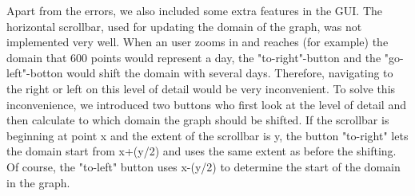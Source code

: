Apart from the errors, we also included some extra features in the GUI. The horizontal scrollbar, used for updating the domain of the graph, was not implemented very well. When an user zooms in and reaches (for example) the domain that 600 points would represent a day, the "to-right"-button and the "go-left"-botton would shift the domain with several days. Therefore, navigating to the right or left on this level of detail would be very inconvenient.
To solve this inconvenience, we introduced two buttons who first look at the level of detail and then calculate to which domain the graph should be shifted. If the scrollbar is beginning at point x and the extent of the scrollbar is y, the button "to-right" lets the domain start from x+(y/2) and uses the same extent as before the shifting. Of course, the "to-left" button uses x-(y/2) to determine the start of the domain in the graph.